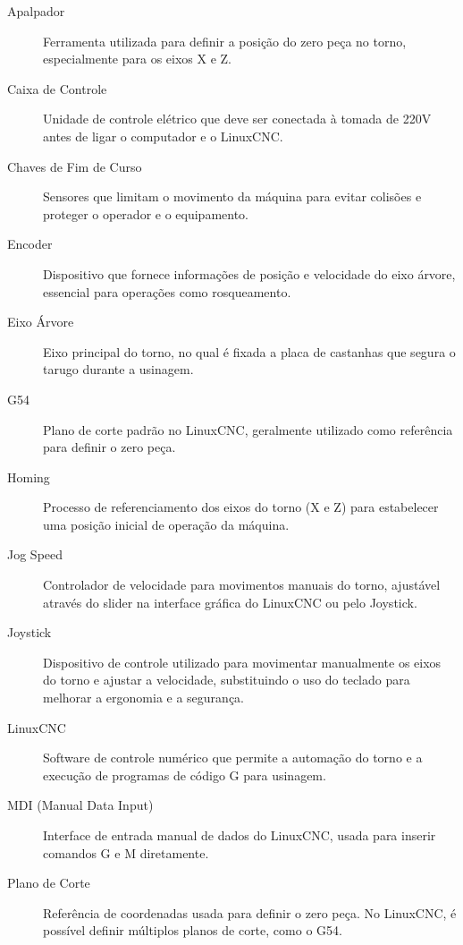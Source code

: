 \documentclass[twoside,a4paper]{refart}
\begin{document}
\begin{description}
	\item[Apalpador] Ferramenta utilizada para definir a posição do zero peça no torno, especialmente para os eixos X e Z.
	
	\item[Caixa de Controle] Unidade de controle elétrico que deve ser conectada à tomada de 220V antes de ligar o computador e o LinuxCNC.
	
	\item[Chaves de Fim de Curso] Sensores que limitam o movimento da máquina para evitar colisões e proteger o operador e o equipamento.
	
	\item[Encoder] Dispositivo que fornece informações de posição e velocidade do eixo árvore, essencial para operações como rosqueamento.
	
	\item[Eixo Árvore] Eixo principal do torno, no qual é fixada a placa de castanhas que segura o tarugo durante a usinagem.
	
	\item[G54] Plano de corte padrão no LinuxCNC, geralmente utilizado como referência para definir o zero peça.
	
	\item[Homing] Processo de referenciamento dos eixos do torno (X e Z) para estabelecer uma posição inicial de operação da máquina.
	
	\item[Jog Speed] Controlador de velocidade para movimentos manuais do torno, ajustável através do slider na interface gráfica do LinuxCNC ou pelo Joystick.
	
	\item[Joystick] Dispositivo de controle utilizado para movimentar manualmente os eixos do torno e ajustar a velocidade, substituindo o uso do teclado para melhorar a ergonomia e a segurança.
	
	\item[LinuxCNC] Software de controle numérico que permite a automação do torno e a execução de programas de código G para usinagem.
	
	\item[MDI (Manual Data Input)] Interface de entrada manual de dados do LinuxCNC, usada para inserir comandos G e M diretamente.
	
	\item[Plano de Corte] Referência de coordenadas usada para definir o zero peça. No LinuxCNC, é possível definir múltiplos planos de corte, como o G54.
	

\end{description}
\end{document}
